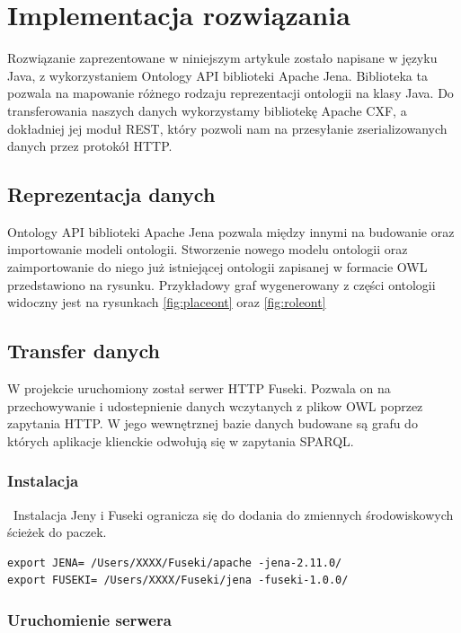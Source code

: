 \section{Implementacja rozwiązania}
\label{cha:impl}

Rozwiązanie zaprezentowane w niniejszym artykule zostało napisane w języku Java, z wykorzystaniem Ontology API biblioteki Apache Jena. Biblioteka ta pozwala na mapowanie różnego rodzaju reprezentacji ontologii na klasy Java. Do transferowania naszych danych wykorzystamy bibliotekę Apache CXF, a dokładniej jej moduł REST, który pozwoli nam na przesyłanie zserializowanych danych przez protokół HTTP.

\subsection{Reprezentacja danych}
\label{sec:persist}

Ontology API biblioteki Apache Jena pozwala między innymi na budowanie oraz importowanie modeli ontologii. Stworzenie nowego modelu ontologii oraz zaimportowanie do niego już istniejącej ontologii zapisanej w formacie OWL przedstawiono na rysunku. Przykładowy graf wygenerowany z części ontologii widoczny jest na rysunkach \ref{fig:placeont} oraz \ref{fig:roleont}

\subsection{Transfer danych}
\label{sec:transfer}

W projekcie uruchomiony został serwer HTTP Fuseki. Pozwala on na przechowywanie i udostepnienie danych wczytanych z plikow OWL poprzez zapytania HTTP. W jego wewnętrznej bazie danych budowane są grafu do których aplikacje klienckie odwołują się w zapytania SPARQL.

\subsubsection{Instalacja}

~Instalacja Jeny i Fuseki ogranicza się do dodania do zmiennych środowiskowych ścieżek do paczek.
\begin{lstlisting}
export JENA= /Users/XXXX/Fuseki/apache -jena-2.11.0/
export FUSEKI= /Users/XXXX/Fuseki/jena -fuseki-1.0.0/
\end{lstlisting}

\subsubsection{Uruchomienie serwera}

